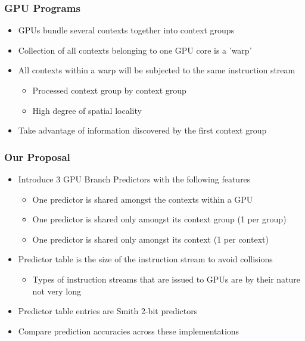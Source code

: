 \documentclass{beamer}
\begin{document}
\begin{frame}
	\frametitle{GPU Programs}
	\begin{itemize}
		\item GPUs bundle several contexts together into context groups
		\item Collection of all contexts belonging to one GPU core is a 'warp'
		\item All contexts within a warp will be subjected to the same instruction stream
		\begin{itemize}
			\item Processed context group by context group
			\item High degree of spatial locality
		\end{itemize}
		\item Take advantage of information discovered by the first context group 
	\end{itemize}
\end{frame}

\begin{frame}
	\frametitle{Our Proposal}
	\begin{itemize}
		\item Introduce 3 GPU Branch Predictors with the following features
		\begin{itemize}
			\item One predictor is shared amongst the contexts within a GPU
			\item One predictor is shared only amongst its context group (1 per group)
			\item One predictor is shared only amongst its context (1 per context)
		\end{itemize}
		\item Predictor table is the size of the instruction stream to avoid collisions
		\begin{itemize}
			\item Types of instruction streams that are issued to GPUs are by their nature not very long
		\end{itemize}
		\item Predictor table entries are Smith 2-bit predictors
		\item Compare prediction accuracies across these implementations
	\end{itemize}
\end{frame}
\end{document}
